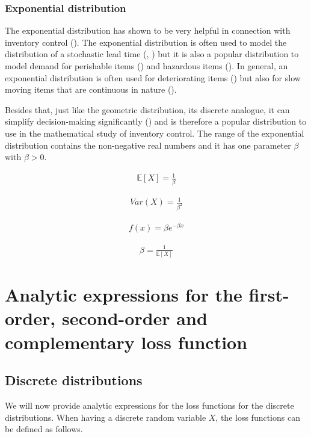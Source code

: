 \documentclass{article}
\begin{document}
\subsubsection{Exponential distribution}
\begin{flushleft}
    The exponential distribution has shown to be very helpful in connection with inventory control (\cite{brown1977materials}).
    The exponential distribution is often used to model the distribution of a stochastic lead time (\cite{articleCarlson2}, \cite{https://doi.org/10.1002/nav.3800230104}) but it is also a popular distribution to model demand for perishable items (\cite{doi:10.1080/17509653.2022.2134222}) and hazardous items (\cite{10.3844/jssp.2009.183.187}).
    In general, an exponential distribution is often used for deteriorating items (\cite{articleOphokenshi}) but also for slow moving items that are continuous in nature (\cite{SNYDER1984373}).
\end{flushleft}
\begin{flushleft}
    Besides that, just like the geometric distribution, its discrete analogue, it can simplify decision-making significantly (\cite{ArrowKarlinScarf}) and is therefore a popular distribution to use in the mathematical study of inventory control.
    The range of the exponential distribution contains the non-negative real numbers and it has one parameter $\beta$ with $\beta > 0$.

    \begin{align*}
        \mathbb{E}[X] = \frac{1}{\beta}
    \end{align*}

    \begin{align*}
        Var(X) = \frac{1}{\beta^2}
    \end{align*}

    \begin{align*}
        f(x) = \beta e^{-\beta x }
    \end{align*}

    \begin{align*}
        \beta = \frac{1}{\mathbb{E}[X]}
    \end{align*}

\end{flushleft}

\section{Analytic expressions for the first-order, second-order and complementary loss function}
\subsection{Discrete distributions}
We will now provide analytic expressions for the loss functions for the discrete distributions.
When having a discrete random variable $X$, the loss functions can be defined as follows.
\end{document}
